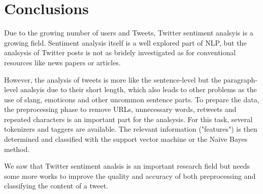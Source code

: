 \section{Conclusions}
Due to the growing number of users and Tweets, Twitter sentiment analsyis is a growing field. Sentiment analysis itself is a well explored part of NLP, but the analsysis of Twitter posts is not as bridely investigated as for conventional resources like news papers or articles. 

However, the analysis of tweets is more like the sentence-level but the paragraph-level analsyis due to their short length, which also leads to other problems as the use of slang, emoticons and other uncommon sentence parts. To prepare the data, the preprocessing phase to remove URLs, unnecessary words, retweets and repeated characters is an important part for the analsysis. For this task, several tokenizers and taggers are available. The relevant information ("features") is then determined and classified with the support vector machine or the Na\"ive Bayes method.

We saw that Twitter sentiment analsis is an important research field but needs some more works to improve the quality and accuracy of both preprocessing and classifying the content of a tweet.
